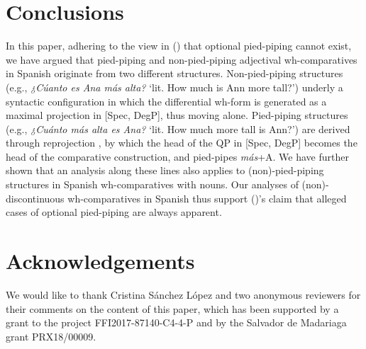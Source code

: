 \documentclass[output=paper,colorlinks,citecolor=brown]{langscibook}
\begin{document}
\section{Conclusions}
\label{sec:eguren:6}

In this paper, adhering to the view in \citeauthor{heck2008pied} (\citeyear{heck2008pied,heck2009certain}) that optional pied-piping cannot exist, we have argued that pied-piping and non-pied-piping adjectival wh-comparatives in Spanish originate from two different structures. Non-pied-piping structures (e.g., \textit{¿Cúanto es Ana más alta?} `lit. How much is Ann more tall?') underly a syntactic configuration in which the differential wh-form is generated as a maximal projection in [Spec, DegP], thus moving alone. Pied-piping structures (e.g., \textit{¿Cuánto más alta es Ana?} `lit. How much more tall is Ann?') are derived through reprojection \citep{hornstein2002reprojections}, by which the head of the QP in [Spec, DegP] becomes the head of the comparative construction, and pied-pipes \textit{más}+A. We have further shown that an analysis along these lines also applies to (non)-pied-piping structures in Spanish wh-comparatives with nouns. Our analyses of (non)-discontinuous wh-comparatives in Spanish thus support \citeauthor{heck2008pied} (\citeyear{heck2008pied,heck2009certain})'s claim that alleged cases of optional pied-piping are always apparent.

\section*{Acknowledgements}
We would like to thank Cristina Sánchez López and two anonymous reviewers for their comments on the content of this paper, which has been supported by a grant to the project FFI2017-87140-C4-4-P and by the Salvador de Madariaga grant PRX18/00009.

\printbibliography[heading=subbibliography,notkeyword=this]
\end{document}
